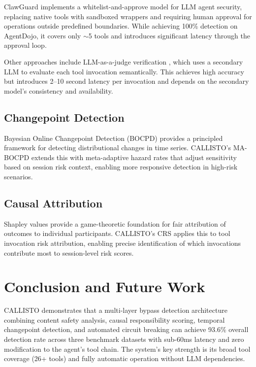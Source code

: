 \documentclass[10pt,conference]{IEEEtran}
\begin{document}
ClawGuard \cite{clawguard} implements a whitelist-and-approve model for LLM agent security, replacing native tools with sandboxed wrappers and requiring human approval for operations outside predefined boundaries. While achieving 100\% detection on AgentDojo, it covers only $\sim$5 tools and introduces significant latency through the approval loop.

Other approaches include LLM-as-a-judge verification \cite{llmjudge}, which uses a secondary LLM to evaluate each tool invocation semantically. This achieves high accuracy but introduces 2–10 second latency per invocation and depends on the secondary model's consistency and availability.

\subsection{Changepoint Detection}

Bayesian Online Changepoint Detection (BOCPD) \cite{bocpd} provides a principled framework for detecting distributional changes in time series. CALLISTO's MA-BOCPD extends this with meta-adaptive hazard rates that adjust sensitivity based on session risk context, enabling more responsive detection in high-risk scenarios.

\subsection{Causal Attribution}

Shapley values \cite{shapley} provide a game-theoretic foundation for fair attribution of outcomes to individual participants. CALLISTO's CRS applies this to tool invocation risk attribution, enabling precise identification of which invocations contribute most to session-level risk scores.

\section{Conclusion and Future Work}

CALLISTO demonstrates that a multi-layer bypass detection architecture combining content safety analysis, causal responsibility scoring, temporal changepoint detection, and automated circuit breaking can achieve 93.6\% overall detection rate across three benchmark datasets with sub-60ms latency and zero modification to the agent's tool chain. The system's key strength is its broad tool coverage (26+ tools) and fully automatic operation without LLM dependencies.
\end{document}
